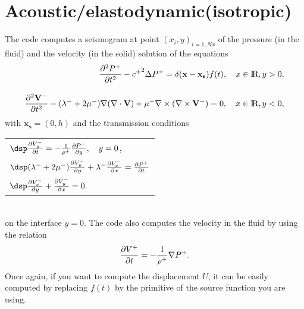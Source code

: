 \documentclass[11pt,a4]{article}
\begin{document}
\section{Acoustic/elastodynamic(isotropic)}
The code computes a seismogram at point
$(x_i,y)_{i=1,Nx}$ of the pressure (in the fluid) and the
velocity (in the solid) solution of the equations
\begin{eqnarray}
 \frac{\partial ^2 P^+}{\partial t^2}-{c^+}^2 \Delta P^+=\delta({\mathbf x}-\mathbf{x_s})f(t),\quad x\in\hbox{I}\!\hbox{R}, y>0,\\[10pt]
 \frac{\partial ^2 \mathbf{V}^-}{\partial t^2}-(\lambda^-+2\mu^-)
 {\mathbf \nabla} (\nabla \cdot {\mathbf{V}})+\mu^-\nabla\times(\nabla \times {\mathbf{V}^-})=0,\quad x\in\hbox{I}\!\hbox{R}, y<0,
\end{eqnarray}
with  $\mathbf{x_s}=(0,h)$ and the transmission conditions\\[10pt]
\begin{tabular}{|l} 
$\dsp \derp {V^-_y}t=-\frac{1}{\rho^+}\derp {P^+}{y},\quad y=0$, \\[10pt]
$\dsp (\lambda^-+2\mu^-) \derp {V_y^-}{y}+\lambda^- \derp{V_x^-}{x}=\derp{P^+}{t}$\\[10pt]
$\dsp \derp{V_x^-}y+\derp {V_y^-} x=0.$
\end{tabular}\\[10pt]
on the interface $y=0$. 
The code  also computes the velocity in the fluid by using the relation
$$\frac{\partial V^+}{\partial t} =-\frac{1}{\rho^+}\nabla P^+.$$ 
Once again, if you want to compute the displacement $U$, it can be easily computed by replacing $f(t)$ by the primitive of the source function you are using.
\end{document}
